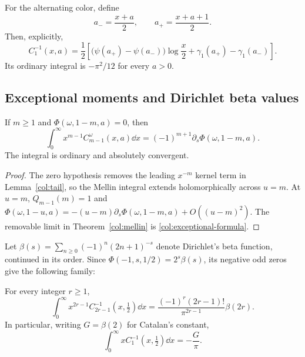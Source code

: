 For the alternating color, define
\[
 a_-=\frac{x+a}{2},\qquad a_+=\frac{x+a+1}{2}.
\]
Then, explicitly,
\begin{equation}\label{col:alternating-C1}
 C_1^{-1}(x,a)=\frac12\left[
    \bigl(\psi(a_+)-\psi(a_-)\bigr)\log\frac x2
                 +\gamma_1(a_+)-\gamma_1(a_-)\right].
\end{equation}
Its ordinary integral is $-\pi^2/12$ for every $a>0$.

\subsection{Exceptional moments and Dirichlet beta values}

\begin{theorem}\label{col:exceptional}
If $m\ge1$ and $\Phi(\omega,1-m,a)=0$, then
\begin{equation}\label{col:exceptional-formula}
 \boxed{\displaystyle
 \int_0^\infty x^{m-1}C_{m-1}^\omega(x,a)\dd x
       =(-1)^{m+1}\partial_s\Phi(\omega,1-m,a).}
\end{equation}
The integral is ordinary and absolutely convergent.
\end{theorem}

\begin{proof}
The zero hypothesis removes the leading $x^{-m}$ kernel term in
Lemma~\ref{col:tail}, so the Mellin integral extends
holomorphically across $u=m$. At $u=m$, $Q_{m-1}(m)=1$ and
$\Phi(\omega,1-u,a)=-(u-m)\partial_s\Phi(\omega,1-m,a)
 +O((u-m)^2)$. The removable limit in
Theorem~\ref{col:mellin} is \eqref{col:exceptional-formula}.
\end{proof}

Let $\beta(s)=\sum_{n\ge0}(-1)^n(2n+1)^{-s}$ denote Dirichlet's beta
function, continued in its order. Since
$\Phi(-1,s,1/2)=2^s\beta(s)$, its negative odd zeros give the following
family:
\begin{corollary}\label{col:beta}
For every integer $r\ge1$,
\begin{equation}\label{col:beta-formula}
 \boxed{\displaystyle
 \int_0^\infty x^{2r-1}C_{2r-1}^{-1}(x,\tfrac12)\dd x
   =\frac{(-1)^r(2r-1)!}{\pi^{2r-1}}\beta(2r).}
\end{equation}
In particular, writing $G=\beta(2)$ for Catalan's constant,
\begin{equation}\label{col:catalan}
 \int_0^\infty xC_1^{-1}(x,\tfrac12)\dd x=-\frac G\pi.
\end{equation}
\end{corollary}

